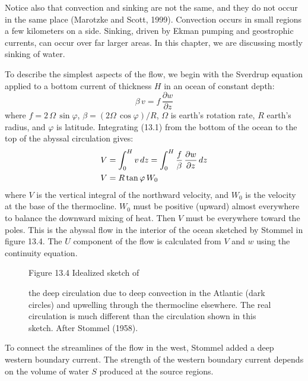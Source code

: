 Notice also that convection and sinking are not the same, and they do not occur in the same place (Marotzke and Scott, 1999). Convection occurs in small regions a few kilometers on a side. Sinking, driven by Ekman pumping and geostrophic currents, can occur over far larger areas. In this chapter, we are discussing mostly sinking of water.

To describe the simplest aspects of the flow, we begin with the Sverdrup equation
applied to a bottom current of thickness $H$ in an ocean of constant depth:
\begin{equation}
\beta\,v =f\,\frac{\partial{w}}{\partial{z}}
\end{equation}
where $f =2\,\Omega\,\sin \varphi$, $\beta = \left(2\Omega\,\cos \varphi
\right)/{R}$, $\Omega$ is earth's rotation rate, $R$ earth's radius, and
$\varphi$ is latitude. Integrating (13.1) from the bottom of the ocean to the top
of the abyssal circulation gives:
\begin{align}
V &= \int_{0}^{H} v\,dz = \int_{0}^{H}
\frac{f}{\beta}\,\frac{\partial{w}}{\partial{z}}\,dz \notag \\
V &= R \tan \varphi \,W_0
\end{align}
where $V$ is the vertical integral of the northward velocity, and $W_0$ is the
velocity at the base of the thermocline. $W_0$ must be
positive (upward) almost everywhere to balance the downward mixing of heat. Then $V$ must be everywhere toward the poles. This is the abyssal flow in
the interior of the ocean sketched by Stommel in figure 13.4.  The $U$ component of the flow
is calculated from
$V$ and $w$ using the continuity equation.

\begin{figure}[t!]
{}
\footnotesize
Figure 13.4 Idealized sketch of \rule{0mm}{4ex}the deep circulation
due to deep convection in the Atlantic (dark circles) and
upwelling through the
thermocline elsewhere. The real circulation
is much different than the circulation shown in this sketch. After Stommel (1958).

\label{fig:stommeldeep}
\vspace{-3ex}
\end{figure}

To connect the streamlines of the flow in the west, Stommel added a deep western
boundary current. The strength of the western boundary current depends on the
volume of water $S$ produced at the source regions. 

